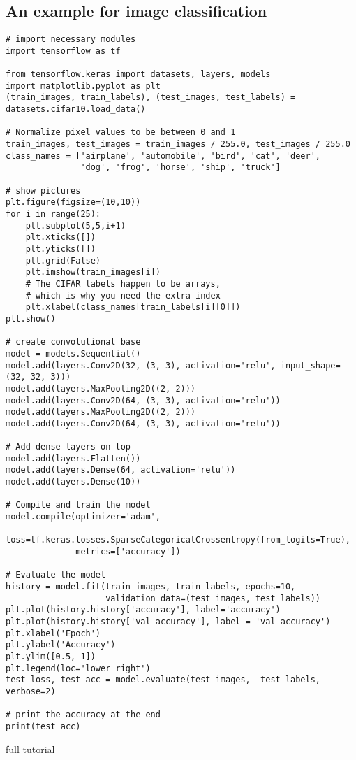 \documentclass[main.tex,fontsize=8pt,paper=a4,paper=portrait,DIV=calc,]{scrartcl}
\begin{document}
\subsection{An example for image classification}
\begin{lstlisting}
# import necessary modules
import tensorflow as tf

from tensorflow.keras import datasets, layers, models
import matplotlib.pyplot as plt
(train_images, train_labels), (test_images, test_labels) = datasets.cifar10.load_data()

# Normalize pixel values to be between 0 and 1
train_images, test_images = train_images / 255.0, test_images / 255.0
class_names = ['airplane', 'automobile', 'bird', 'cat', 'deer',
               'dog', 'frog', 'horse', 'ship', 'truck']

# show pictures
plt.figure(figsize=(10,10))
for i in range(25):
    plt.subplot(5,5,i+1)
    plt.xticks([])
    plt.yticks([])
    plt.grid(False)
    plt.imshow(train_images[i])
    # The CIFAR labels happen to be arrays, 
    # which is why you need the extra index
    plt.xlabel(class_names[train_labels[i][0]])
plt.show()

# create convolutional base
model = models.Sequential()
model.add(layers.Conv2D(32, (3, 3), activation='relu', input_shape=(32, 32, 3)))
model.add(layers.MaxPooling2D((2, 2)))
model.add(layers.Conv2D(64, (3, 3), activation='relu'))
model.add(layers.MaxPooling2D((2, 2)))
model.add(layers.Conv2D(64, (3, 3), activation='relu'))

# Add dense layers on top 
model.add(layers.Flatten())
model.add(layers.Dense(64, activation='relu'))
model.add(layers.Dense(10))

# Compile and train the model
model.compile(optimizer='adam',
              loss=tf.keras.losses.SparseCategoricalCrossentropy(from_logits=True),
              metrics=['accuracy'])

# Evaluate the model
history = model.fit(train_images, train_labels, epochs=10, 
                    validation_data=(test_images, test_labels))
plt.plot(history.history['accuracy'], label='accuracy')
plt.plot(history.history['val_accuracy'], label = 'val_accuracy')
plt.xlabel('Epoch')
plt.ylabel('Accuracy')
plt.ylim([0.5, 1])
plt.legend(loc='lower right')
test_loss, test_acc = model.evaluate(test_images,  test_labels, verbose=2)

# print the accuracy at the end
print(test_acc)

\end{lstlisting}
\href{https://www.tensorflow.org/tutorials/images/cnn}{full tutorial}
\end{document}
